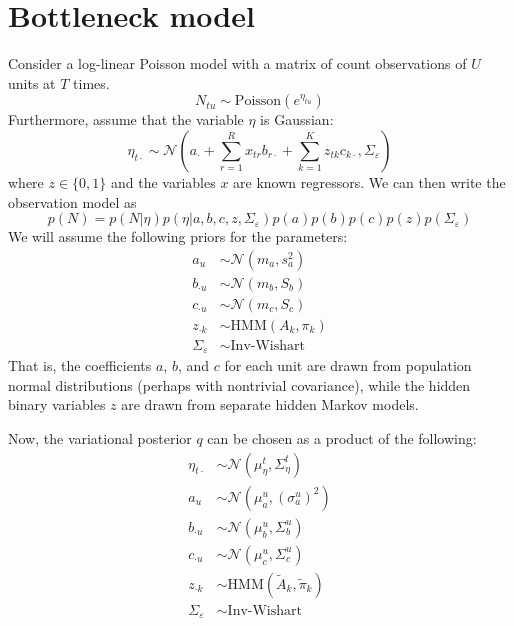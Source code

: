 \documentclass[11pt]{article}
\begin{document}
\section{Bottleneck model}
Consider a log-linear Poisson model with a matrix of count observations of $U$ units at $T$ times.
\begin{equation}
    N_{tu} \sim \mathrm{Poisson}(e^{\eta_{tu}})
\end{equation}
Furthermore, assume that the variable $\eta$ is Gaussian:
\begin{equation}
    \eta_{t\cdot} \sim \mathcal{N}\left(a_{\cdot} + \sum_{r=1}^R x_{tr} b_{r\cdot} +
    \sum_{k=1}^K z_{tk} c_{k\cdot}, \Sigma_\varepsilon\right)
\end{equation}
where $z \in \{0, 1\}$ and the variables $x$ are known regressors. We can then write the observation model as
\begin{equation}
    p(N) = p(N|\eta) p(\eta|a, b, c, z, \Sigma_\varepsilon) p(a) p(b) p(c) p(z) p(\Sigma_\varepsilon)
\end{equation}
We will assume the following priors for the parameters:
\begin{align}
    a_u &\sim \mathcal{N}(m_a, s_a^2) \\
    b_{\cdot u} &\sim \mathcal{N}(m_b, S_b) \\
    c_{\cdot u} &\sim \mathcal{N}(m_c, S_c) \\
    z_{\cdot k} &\sim \mathrm{HMM}(A_k, \pi_k) \\
    \Sigma_\varepsilon &\sim \text{Inv-Wishart}
\end{align}
That is, the coefficients $a$, $b$, and $c$ for each unit are drawn from population normal distributions (perhaps with nontrivial covariance), while the hidden binary variables $z$ are drawn from separate hidden Markov models.

Now, the variational posterior $q$ can be chosen as a product of the following:
\begin{align}
    \eta_{t\cdot} &\sim \mathcal{N}(\mu^t_\eta, \Sigma^t_\eta) \\
    a_u &\sim \mathcal{N}(\mu^u_a, (\sigma^u_a)^2) \\
    b_{\cdot u} &\sim \mathcal{N}(\mu^u_b, \Sigma^u_b) \\
    c_{\cdot u} &\sim \mathcal{N}(\mu^u_c, \Sigma^u_c) \\
    z_{\cdot k} &\sim \mathrm{HMM}(\tilde{A}_k, \tilde{\pi}_k) \\
    \Sigma_\varepsilon &\sim \text{Inv-Wishart}
\end{align}
\end{document}
